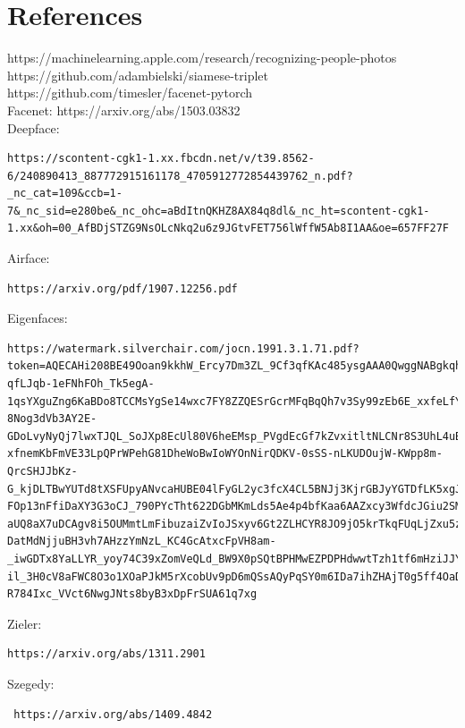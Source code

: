 \documentclass[10pt,twocolumn,letterpaper]{article}
\begin{document}
\section{References}
https://machinelearning.apple.com/research/recognizing-people-photos\\
https://github.com/adambielski/siamese-triplet\\
https://github.com/timesler/facenet-pytorch\\
Facenet: https://arxiv.org/abs/1503.03832\\
Deepface: \begin{verbatim}https://scontent-cgk1-1.xx.fbcdn.net/v/t39.8562-6/240890413_887772915161178_4705912772854439762_n.pdf?_nc_cat=109&ccb=1-7&_nc_sid=e280be&_nc_ohc=aBdItnQKHZ8AX84q8dl&_nc_ht=scontent-cgk1-1.xx&oh=00_AfBDjSTZG9NsOLcNkq2u6z9JGtvFET756lWffW5Ab8I1AA&oe=657FF27F\end{verbatim}
Airface: \begin{verbatim}https://arxiv.org/pdf/1907.12256.pdf\end{verbatim}
Eigenfaces: \begin{verbatim}
https://watermark.silverchair.com/jocn.1991.3.1.71.pdf?token=AQECAHi208BE49Ooan9kkhW_Ercy7Dm3ZL_9Cf3qfKAc485ysgAAA0QwggNABgkqhkiG9w0BBwagggMxMIIDLQIBADCCAyYGCSqGSIb3DQEHATAeBglghkgBZQMEAS4wEQQMUiv3zocAFNGM9C4VAgEQgIIC92e61Fsz2G8f2mUnuskvtgm4l-qfLJqb-1eFNhFOh_Tk5egA-1qsYXguZng6KaBDo8TCCMsYgSe14wxc7FY8ZZQESrGcrMFqBqQh7v3Sy99zEb6E_xxfeLfYgbvNwX7Im1WkQDi_FjB3zu3QExFpMYKdWBA5A0BjZ6IYs9AnWOrTEypl4T8i83XYltBWGyophE2iTO8hu5cOYXOo7e94mAcE_9YyvkB-8Nog3dVb3AY2E-GDoLvyNyQj7lwxTJQL_SoJXp8EcUl80V6heEMsp_PVgdEcGf7kZvxitltNLCNr8S3UhL4uBO59MWMD4sAoDH-xfnemKbFmVE33LpQPrWPehG81DheWoBwIoWYOnNirQDKV-0sSS-nLKUDOujW-KWpp8m-QrcSHJJbKz-G_kjDLTBwYUTd8tXSFUpyANvcaHUBE04lFyGL2yc3fcX4CL5BNJj3KjrGBJyYGTDfLK5xgJDb2weY1FBtybdVnft8SkgZs1YQmZTi73wxTD9xt7YjQf0G17ZQwuj0-FOp13nFfiDaXY3G3oCJ_790PYcTht622DGbMKmLds5Ae4p4bfKaa6AAZxcy3WfdcJGiu2SMzmDFvYy-aUQ8aX7uDCAgv8i5OUMmtLmFibuzaiZvIoJSxyv6Gt2ZLHCYR8JO9jO5krTkqFUqLjZxu5zmu56uIYa9CIMoNK9eZC-DatMdNjjuBH3vh7AHzzYmNzL_KC4GcAtxcFpVH8am-_iwGDTx8YaLLYR_yoy74C39xZomVeQLd_BW9X0pSQtBPHMwEZPDPHdwwtTzh1tf6mHziJJYvtrm9xIlz2L-il_3H0cV8aFWC8O3o1XOaPJkM5rXcobUv9pD6mQSsAQyPqSY0m6IDa7ihZHAjT0g5ff4OaD6z9AgnCg7kx3cNAqQwklKUNGQfpsjK_7OoY9ZWnkA7VEJppGpfbgzevcDgzHmpBnGF52HjI6lPznZ7eX-R784Ixc_VVct6NwgJNts8byB3xDpFrSUA61q7xg
\end{verbatim}
Zieler: \begin{verbatim}
https://arxiv.org/abs/1311.2901
\end{verbatim}
Szegedy: \begin{verbatim} https://arxiv.org/abs/1409.4842 \end{verbatim}
\end{document}
